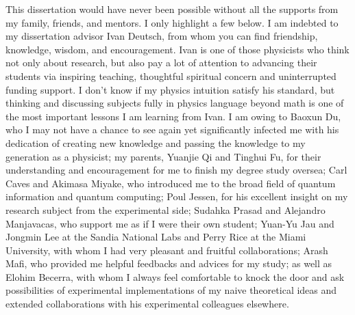 \begin{acknowledgments}
\noindent This dissertation would have never been possible without all the supports from my family, friends, and mentors. I only highlight a few below. 
I am indebted to my dissertation advisor Ivan Deutsch, from whom you can find friendship, knowledge, wisdom, and encouragement.  Ivan is one of those physicists who think not only about research, but also pay a lot of attention to advancing their students via inspiring teaching, thoughtful spiritual concern and uninterrupted funding support. I don't know if my physics intuition satisfy his standard, but thinking and discussing subjects fully in physics language beyond math is one of the most important lessons I am learning from Ivan. 
I am owing to Baoxun Du, who I may not have a chance to see again yet significantly infected me with his dedication of creating new knowledge and passing the knowledge to my generation as a physicist; my parents, Yuanjie Qi and Tinghui Fu, for their understanding and encouragement for me to finish my degree study oversea; Carl Caves and Akimasa Miyake, who introduced me to the broad field of quantum information and quantum computing; Poul Jessen, for his excellent insight on my research subject from the experimental side; Sudahka Prasad and Alejandro Manjavacas, who support me as if I were their own student; Yuan-Yu Jau and Jongmin Lee at the Sandia National Labs and Perry Rice at the Miami University, with whom I had very pleasant and fruitful collaborations; Arash Mafi, who provided me helpful feedbacks and advices for my study; as well as Elohim Becerra, with whom I always feel comfortable to knock the door and ask possibilities of experimental implementations of my naive theoretical ideas and extended collaborations with his experimental colleagues elsewhere.


\end{acknowledgments}
